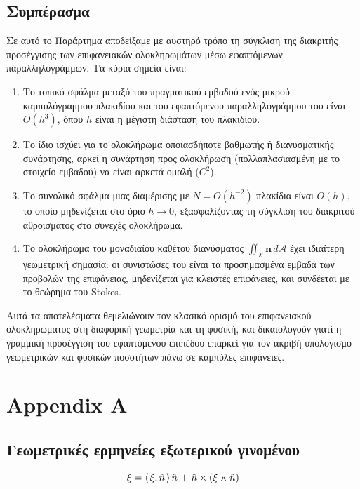 \documentclass[10pt,a4paper,twoside,openany]{book}
\theoremstyle{plain}
\theoremstyle{definition}
\theoremstyle{remark}
\numberwithin{equation}{section}
\begin{document}
\section{Συμπέρασμα}

Σε αυτό το Παράρτημα αποδείξαμε με αυστηρό τρόπο τη σύγκλιση της διακριτής προσέγγισης των επιφανειακών ολοκληρωμάτων μέσω εφαπτόμενων παραλληλογράμμων. Τα κύρια σημεία είναι:

\begin{enumerate}
\item Το τοπικό σφάλμα μεταξύ του πραγματικού εμβαδού ενός μικρού καμπυλόγραμμου πλακιδίου και του εφαπτόμενου παραλληλογράμμου του είναι \(O(h^3)\), όπου \(h\) είναι η μέγιστη διάσταση του πλακιδίου.

\item Το ίδιο ισχύει για το ολοκλήρωμα οποιασδήποτε βαθμωτής ή διανυσματικής συνάρτησης, αρκεί η συνάρτηση προς ολοκλήρωση (πολλαπλασιασμένη με το στοιχείο εμβαδού) να είναι αρκετά ομαλή (\(C^2\)).

\item Το συνολικό σφάλμα μιας διαμέρισης με \(N = O(h^{-2})\) πλακίδια είναι \(O(h)\), το οποίο μηδενίζεται στο όριο \(h \to 0\), εξασφαλίζοντας τη σύγκλιση του διακριτού αθροίσματος στο συνεχές ολοκλήρωμα.

\item Το ολοκλήρωμα του μοναδιαίου καθέτου διανύσματος \(\iint_{\mathcal{S}} \mathbf{n} \, d\mathcal{A}\) έχει ιδιαίτερη γεωμετρική σημασία: οι συνιστώσες του είναι τα προσημασμένα εμβαδά των προβολών της επιφάνειας, μηδενίζεται για κλειστές επιφάνειες, και συνδέεται με το θεώρημα του Stokes.
\end{enumerate}

Αυτά τα αποτελέσματα θεμελιώνουν τον κλασικό ορισμό του επιφανειακού ολοκληρώματος στη διαφορική γεωμετρία και τη φυσική, και δικαιολογούν γιατί η γραμμική προσέγγιση του εφαπτόμενου επιπέδου επαρκεί για τον ακριβή υπολογισμό γεωμετρικών και φυσικών ποσοτήτων πάνω σε καμπύλες επιφάνειες.

\appendix
\chapter{Appendix A}

\section{Γεωμετρικές ερμηνείες εξωτερικού γινομένου}

\begin{equation}
\xi
=
\langle \hspace{1.5pt} \xi, \hat{n} \hspace{1.5pt} \rangle \hspace{1.5pt} \hat{n}
\hspace{1pt}
+
\hspace{1pt}
\hat{n} \times (\xi \times \hat{n})
\end{equation}
\end{document}

